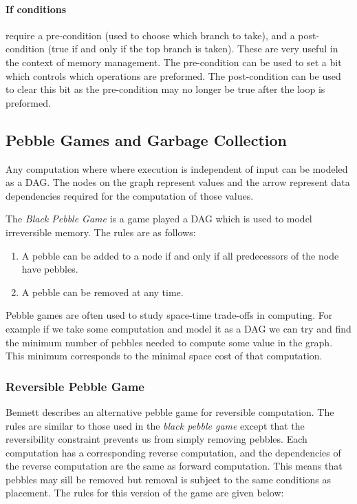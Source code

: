 \paragraph{If conditions} require a pre-condition (used to choose which branch
to take), and a post-condition (true if and only if the top branch is taken).
These are very useful in the context of memory management. The pre-condition can
be used to set a bit which controls which operations are preformed. The
post-condition can be used to clear this bit as the pre-condition may no longer
be true after the loop is preformed.


\subsection{Pebble Games and Garbage Collection}

Any computation where where execution is independent of input can be modeled as
a DAG. The nodes on the graph represent values and the arrow represent data
dependencies required for the computation of those values.

The \emph{Black Pebble Game} is a game played a DAG which is used to model
irreversible memory. The rules are as follows:
\begin{enumerate}
  \item A pebble can be added to a node if and only if all predecessors of the
    node have pebbles.
  \item A pebble can be removed at any time.
\end{enumerate}

Pebble games are often used to study space-time trade-offs in computing. For
example if we take some computation and model it as a DAG we can try and find
the minimum number of pebbles needed to compute some value in the graph. This
minimum corresponds to the minimal space cost of that computation.

\subsubsection{Reversible Pebble Game}

Bennett\cite{Bennett:89} describes an alternative pebble game for reversible
computation. The rules are similar to those used in the \emph{black pebble
game} except that the reversibility constraint prevents us from simply removing
pebbles. Each computation has a corresponding reverse computation, and the
dependencies of the reverse computation are the same as forward computation.
This means that pebbles may sill be removed but removal is subject to the same
conditions as placement. The rules for this version of the game are given below:

